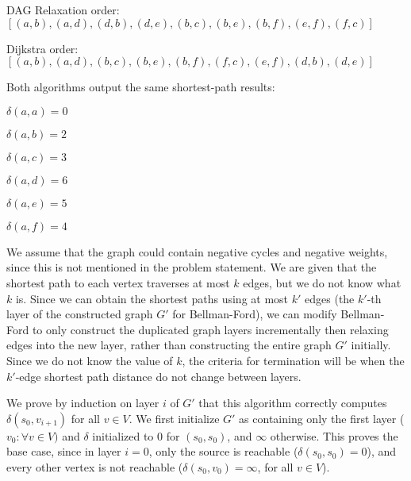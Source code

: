 \documentclass[12pt,twoside]{article}
\begin{document}


\begin{problems}

\problem  %

\begin{problemparts}
\problempart %
DAG Relaxation order: $[(a,b),(a,d),(d,b),(d,e),(b,c),(b,e),(b,f),(e,f),(f,c)]$

Dijkstra order: $[(a,b),(a,d),(b,c),(b,e),(b,f),(f,c),(e,f),(d,b),(d,e)]$

\problempart %
Both algorithms output the same shortest-path results:

$\delta(a,a)=0$ 

$\delta(a,b)=2$ 

$\delta(a,c)=3$ 

$\delta(a,d)=6$ 

$\delta(a,e)=5$ 

$\delta(a,f)=4$

\end{problemparts}

\newpage
\problem  %
We assume that the graph could contain negative cycles and negative weights, since this is not mentioned in the problem statement. We are given that the shortest path to each vertex traverses at most $k$ edges, but we do not know what $k$ is. Since we can obtain the shortest paths using at most $k'$ edges (the $k'$-th layer of the constructed graph $G'$ for Bellman-Ford), we can modify Bellman-Ford to only construct the duplicated graph layers incrementally then relaxing edges into the new layer, rather than constructing the entire graph $G'$ initially. Since we do not know the value of $k$, the criteria for termination will be when the $k'$-edge shortest path distance do not change between layers.

We prove by induction on layer $i$ of $G'$ that this algorithm correctly computes $\delta(s_0, v_{i+1})$ for all $v \in V$. We first initialize $G'$ as containing only the first layer ($v_0: \forall v \in V)$ and $\delta$ initialized to 0 for $(s_0,s_0)$, and $\infty$ otherwise. This proves the base case, since in layer $i=0$, only the source is reachable ($\delta(s_0,s_0)=0$), and every other vertex is not reachable ($\delta(s_0, v_0)=\infty$, for all $v \in V$).


\end{problems}
\end{document}
